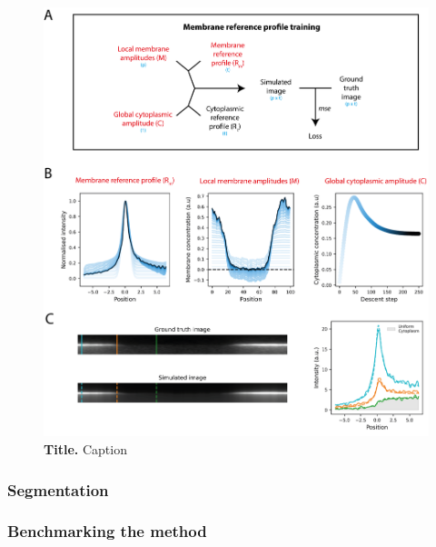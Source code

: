 \documentclass[11pt]{"article"}
\newcommand{\mycaption}[2]{\caption[#1]{\textbf{#1.} #2}}
\begin{document}
\begin{figure}[!h]
\includegraphics[scale=1]{memquant_membg_training}
\setlength{\abovecaptionskip}{20pt}
\centering
\mycaption{Title}{Caption}
\end{figure}

\clearpage
\subsubsection{Segmentation}


\clearpage
\subsubsection{Benchmarking the method}
\end{document}
